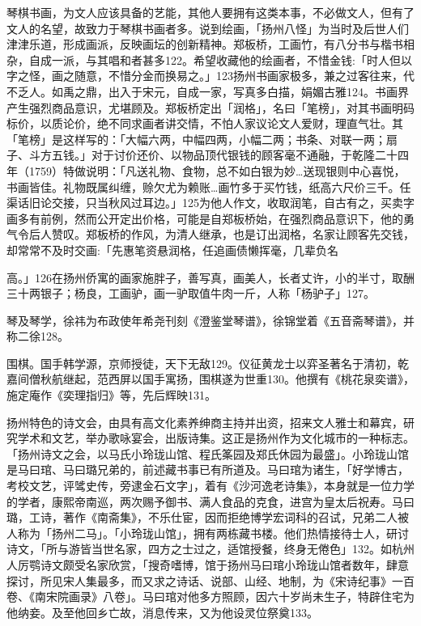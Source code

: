 琴棋书画，为文人应该具备的艺能，其他人要拥有这类本事，不必做文人，但有了文人的名望，故致力于琴棋书画者多。说到绘画，「扬州八怪」为当时及后世人们津津乐道，形成画派，反映画坛的创新精神。郑板桥，工画竹，有八分书与楷书相杂，自成一派，与其唱和者甚多122。希望收藏他的绘画者，不惜金钱:「时人但以字之怪，画之随意，不惜分金而换易之。」123扬州书画家极多，兼之过客往来，代不乏人。如禹之鼎，出入于宋元，自成一家，写真多白描，娟媚古雅124。书画界产生强烈商品意识，尤堪顾及。郑板桥定出「润格」，名曰「笔榜」，对其书画明码标价，以质论价，绝不同求画者讲交情，不怕人家议论文人爱财，理直气壮。其「笔榜」是这样写的：「大幅六两，中幅四两，小幅二两；书条、对联一两；扇子、斗方五钱。」对于讨价还价、以物品顶代银钱的顾客毫不通融，于乾隆二十四年（1759）特做说明：「凡送礼物、食物，总不如白银为妙…送现银则中心喜悦，书画皆佳。礼物既属纠缠，赊欠尤为赖账…画竹多于买竹钱，纸高六尺价三千。任渠话旧论交接，只当秋风过耳边。」125为他人作文，收取润笔，自古有之，买卖字画多有前例，然而公开定出价格，可能是自郑板桥始，在强烈商品意识下，他的勇气令后人赞叹。郑板桥的作风，为清人继承，也是订出润格，名家让顾客先交钱，却常常不及时交画:「先惠笔资悬润格，任追画债懒挥毫，几辈负名

\vfill
\begin{BookNotes}
\end{BookNotes}

\noindent 高。」126在扬州侨寓的画家施胖子，善写真，画美人，长者丈许，小的半寸，取酬三十两银子；杨良，工画驴，画一驴取值牛肉一斤，人称「杨驴子」127。

琴及琴学，徐祎为布政使年希尧刊刻《澄鉴堂琴谱》，徐锦堂着《五音斋琴谱》，并称二徐128。

围棋。国手韩学源，京师授徒，天下无敌129。仪征黄龙士以弈圣著名于清初，乾嘉间僧秋航继起，范西屏以国手寓扬，围棋遂为世重130。他撰有《桃花泉奕谱》，施定庵作《奕理指归》等，先后辉映131。

扬州特色的诗文会，由具有高文化素养绅商主持并出资，招来文人雅士和幕宾，研究学术和文艺，举办歌咏宴会，出版诗集。这正是扬州作为文化城市的一种标志。「扬州诗文之会，以马氏小玲珑山馆、程氏筿园及郑氏休园为最盛」。小玲珑山馆是马曰琯、马曰璐兄弟的，前述藏书事已有所道及。马曰琯为诸生，「好学博古，考校文艺，评骘史传，旁逮金石文字」，着有《沙河逸老诗集》，本身就是一位力学的学者，康熙帝南巡，两次赐予御书、满人食品的克食，进宫为皇太后祝寿。马曰璐，工诗，著作《南斋集》，不乐仕宦，因而拒绝博学宏词科的召试，兄弟二人被人称为「扬州二马」。「小玲珑山馆」，拥有两栋藏书楼。他们热情接待士人，研讨诗文，「所与游皆当世名家，四方之士过之，适馆授餐，终身无倦色」132。如杭州人厉鹗诗文颇受名家欣赏，「搜奇嗜博，馆于扬州马曰琯小玲珑山馆者数年，肆意探讨，所见宋人集最多，而又求之诗话、说部、山经、地制，为《宋诗纪事》一百卷、《南宋院画录》八卷」。马曰琯对他多方照顾，因六十岁尚未生子，特辟住宅为他纳妾。及至他回乡亡故，消息传来，又为他设灵位祭奠133。

